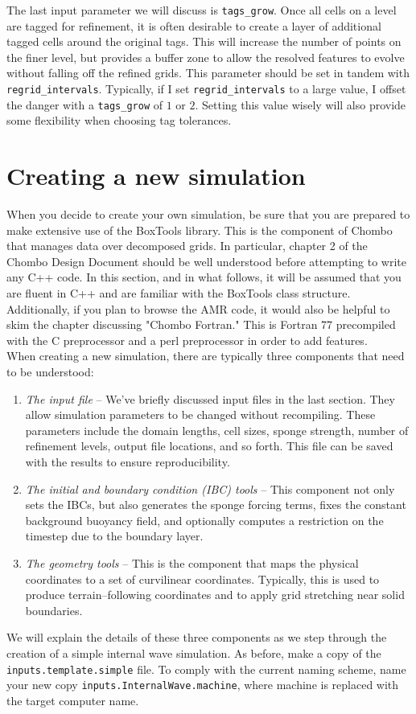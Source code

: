 \documentclass[12pt]{article}
\begin{document}
The last input parameter we will discuss is \texttt{tags\_grow}. Once all cells on a level are tagged for refinement, it is often desirable to create a layer of additional tagged cells around the original tags. This will increase the number of points on the finer level, but provides a buffer zone to allow the resolved features to evolve without falling off the refined grids. This parameter should be set in tandem with \texttt{regrid\_intervals}. Typically, if I set \texttt{regrid\_intervals} to a large value, I offset the danger with a \texttt{tags\_grow} of $1$ or $2$. Setting this value wisely will also provide some flexibility when choosing tag tolerances.

\section{Creating a new simulation}
When you decide to create your own simulation, be sure that you are prepared to make extensive use of the BoxTools library. This is the component of Chombo that manages data over decomposed grids. In particular, chapter 2 of the Chombo Design Document should be well understood before attempting to write any C++ code. In this section, and in what follows, it will be assumed that you are fluent in C++ and are familiar with the BoxTools class structure. Additionally, if you plan to browse the AMR code, it would also be helpful to skim the chapter discussing "Chombo Fortran." This is Fortran 77 precompiled with the C preprocessor and a perl preprocessor in order to add features.\\

When creating a new simulation, there are typically three components that need to be understood:
\begin{enumerate}
  \item \textit{The input file} -- We've briefly discussed input files in the last section. They allow simulation parameters to be changed without recompiling. These parameters include the domain lengths, cell sizes, sponge strength, number of refinement levels, output file locations, and so forth. This file can be saved with the results to ensure reproducibility.
  \item \textit{The initial and boundary condition (IBC) tools} -- This component not only sets the IBCs, but also generates the sponge forcing terms, fixes the constant background buoyancy field, and optionally computes a restriction on the timestep due to the boundary layer.
  \item \textit{The geometry tools} -- This is the component that maps the physical coordinates to a set of curvilinear coordinates. Typically, this is used to produce terrain--following coordinates and to apply grid stretching near solid boundaries.
\end{enumerate}
We will explain the details of these three components as we step through the creation of a simple internal wave simulation. As before, make a copy of the \texttt{inputs.template.simple} file. To comply with the current naming scheme, name your new copy \texttt{inputs.InternalWave.machine}, where machine is replaced with the target computer name.\\
\end{document}
